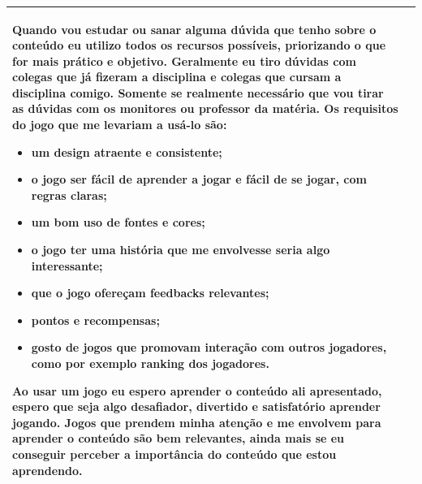 \begin{table}[htbp]
\begin{tabular}{| m{} m{}|}
{        Quando vou estudar ou sanar alguma dúvida que tenho sobre o conteúdo eu utilizo todos os recursos possíveis, priorizando o que for mais prático e objetivo. Geralmente eu tiro dúvidas com colegas que já fizeram a disciplina e colegas que cursam a disciplina comigo. Somente se realmente necessário que vou tirar as dúvidas com os monitores ou professor da matéria. Os requisitos do jogo que me levariam a usá-lo são: 
        
        \begin{itemize}
            \item um design atraente e consistente; 
            \item o jogo ser fácil de aprender a jogar e fácil de se jogar, com regras claras; 
            \item um bom uso de fontes e cores; 
            \item  o jogo ter uma história que me envolvesse seria algo interessante;
            \item que o jogo ofereçam feedbacks relevantes;
            \item pontos e recompensas;
            \item gosto de jogos que promovam interação com outros jogadores, como por exemplo ranking dos jogadores.
        \end{itemize}
        
        Ao usar um jogo eu espero aprender o conteúdo ali apresentado, espero que seja algo desafiador, divertido e satisfatório aprender jogando. Jogos que prendem minha atenção e me envolvem para  aprender o conteúdo são bem relevantes, ainda mais se eu conseguir perceber a importância do conteúdo que estou aprendendo.

       } \\ \hline
\end{tabular}
\end{table}